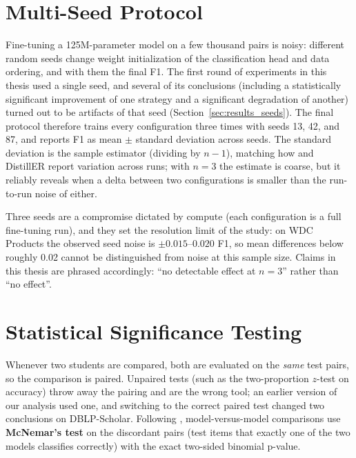 \documentclass[a4paper,oneside,bibliography=totoc]{scrbook}
\begin{document}
\section{Multi-Seed Protocol}
\label{sec:setup_seeds}

Fine-tuning a 125M-parameter model on a few thousand pairs is noisy: different random seeds change weight initialization of the classification head and data ordering, and with them the final F1. The first round of experiments in this thesis used a single seed, and several of its conclusions (including a statistically significant improvement of one strategy and a significant degradation of another) turned out to be artifacts of that seed (Section~\ref{sec:results_seeds}). The final protocol therefore trains every configuration three times with seeds 13, 42, and 87, and reports F1 as mean $\pm$ standard deviation across seeds. The standard deviation is the sample estimator (dividing by $n{-}1$), matching how \citet{steiner2026labeling} and DistillER report variation across runs; with $n{=}3$ the estimate is coarse, but it reliably reveals when a delta between two configurations is smaller than the run-to-run noise of either.

Three seeds are a compromise dictated by compute (each configuration is a full fine-tuning run), and they set the resolution limit of the study: on WDC Products the observed seed noise is $\pm 0.015$--$0.020$ F1, so mean differences below roughly 0.02 cannot be distinguished from noise at this sample size. Claims in this thesis are phrased accordingly: ``no detectable effect at $n{=}3$'' rather than ``no effect''.

\section{Statistical Significance Testing}
\label{sec:setup_significance}

Whenever two students are compared, both are evaluated on the \emph{same} test pairs, so the comparison is paired. Unpaired tests (such as the two-proportion $z$-test on accuracy) throw away the pairing and are the wrong tool; an earlier version of our analysis used one, and switching to the correct paired test changed two conclusions on DBLP-Scholar. Following \citet{dietterich1998approximate}, model-versus-model comparisons use \textbf{McNemar's test} \cite{mcnemar1947note} on the discordant pairs (test items that exactly one of the two models classifies correctly) with the exact two-sided binomial p-value.
\end{document}
